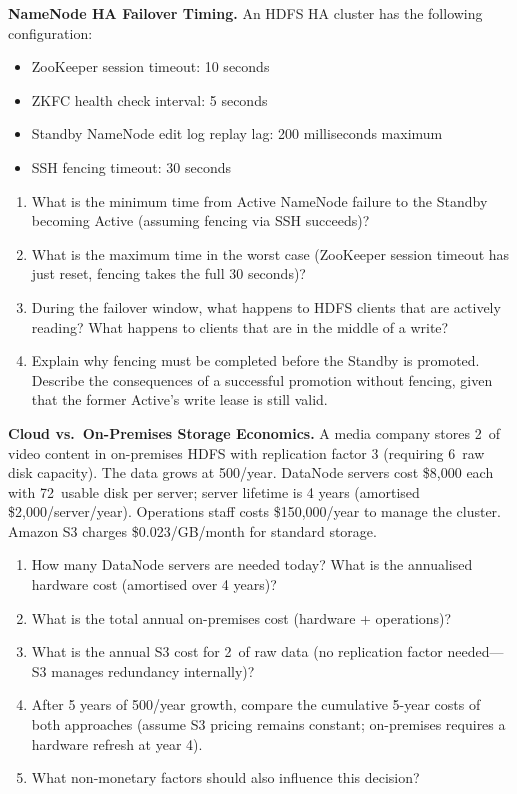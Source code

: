 \ap \textbf{NameNode HA Failover Timing.}
An HDFS HA cluster has the following configuration:
\begin{itemize}
  \item ZooKeeper session timeout: 10 seconds
  \item ZKFC health check interval: 5 seconds
  \item Standby NameNode edit log replay lag: 200 milliseconds maximum
  \item SSH fencing timeout: 30 seconds
\end{itemize}

\begin{enumerate}[label=(\alph*)]
  \item What is the minimum time from Active NameNode failure to the
        Standby becoming Active (assuming fencing via SSH succeeds)?
  \item What is the maximum time in the worst case (ZooKeeper session
        timeout has just reset, fencing takes the full 30 seconds)?
  \item During the failover window, what happens to HDFS clients that
        are actively reading? What happens to clients that are in the
        middle of a write?
  \item Explain why fencing must be completed before the Standby is
        promoted. Describe the consequences of a successful promotion
        without fencing, given that the former Active's write lease is
        still valid.
\end{enumerate}

\ap \textbf{Cloud vs.\ On-Premises Storage Economics.}
A media company stores 2\PB\ of video content in on-premises HDFS
with replication factor 3 (requiring 6\PB\ raw disk capacity). The
data grows at 500\TB/year. DataNode servers cost \$8,000 each with
72\TB\ usable disk per server; server lifetime is 4 years (amortised
\$2,000/server/year). Operations staff costs \$150,000/year to manage
the cluster. Amazon S3 charges \$0.023/GB/month for standard storage.

\begin{enumerate}[label=(\alph*)]
  \item How many DataNode servers are needed today? What is the
        annualised hardware cost (amortised over 4 years)?
  \item What is the total annual on-premises cost (hardware + operations)?
  \item What is the annual S3 cost for 2\PB\ of raw data (no
        replication factor needed---S3 manages redundancy internally)?
  \item After 5 years of 500\TB/year growth, compare the cumulative
        5-year costs of both approaches (assume S3 pricing remains
        constant; on-premises requires a hardware refresh at year 4).
  \item What non-monetary factors should also influence this decision?
\end{enumerate}

